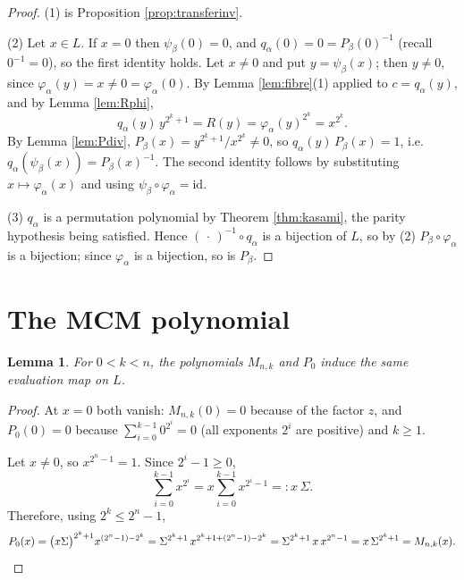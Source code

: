 \documentclass[11pt,a4paper]{article}
\newtheorem{lemma}[theorem]{Lemma}
\theoremstyle{definition}
\newcommand{\rhs}{R}
\begin{document}
\begin{proof}
(1) is Proposition \ref{prop:transferinv}.

(2) Let $x\in L$.  If $x=0$ then $\psi_\beta(0)=0$, and $q_\alpha(0)=0=P_\beta(0)^{-1}$
(recall $0^{-1}=0$), so the first identity holds.  Let $x\neq0$ and put
$y=\psi_\beta(x)$; then $y\neq0$, since $\varphi_\alpha(y)=x\neq0=\varphi_\alpha(0)$.
By Lemma \ref{lem:fibre}(1) applied to $c=q_\alpha(y)$, and by Lemma
\ref{lem:Rphi},
\[
  q_\alpha(y)\,y^{2^{k}+1}=\rhs(y)=\varphi_\alpha(y)^{2^{k}}=x^{2^{k}} .
\]
By Lemma \ref{lem:Pdiv}, $P_\beta(x)=y^{2^{k}+1}/x^{2^{k}}\neq0$, so
$q_\alpha(y)\,P_\beta(x)=1$, i.e. $q_\alpha(\psi_\beta(x))=P_\beta(x)^{-1}$.  The
second identity follows by substituting $x\mapsto\varphi_\alpha(x)$ and using
$\psi_\beta\circ\varphi_\alpha=\mathrm{id}$.

(3) $q_\alpha$ is a permutation polynomial by Theorem \ref{thm:kasami}, the parity
hypothesis being satisfied.  Hence $(\,\cdot\,)^{-1}\circ q_\alpha$ is a bijection
of $L$, so by (2) $P_\beta\circ\varphi_\alpha$ is a bijection; since
$\varphi_\alpha$ is a bijection, so is $P_\beta$.
\end{proof}

\section{The MCM polynomial}\label{sec:mcm}

\begin{lemma}\label{lem:mcmid}
For $0<k<n$, the polynomials $M_{n,k}$ and $P_0$ induce the same evaluation map on
$L$.
\end{lemma}

\begin{proof}
At $x=0$ both vanish: $M_{n,k}(0)=0$ because of the factor $z$, and
$P_0(0)=0$ because $\sum_{i=0}^{k-1}0^{2^{i}}=0$ (all exponents $2^{i}$ are
positive) and $k\ge1$.

Let $x\neq0$, so $x^{2^{n}-1}=1$.  Since $2^{i}-1\ge0$,
\[
  \sum_{i=0}^{k-1}x^{2^{i}}=x\sum_{i=0}^{k-1}x^{2^{i}-1}=:x\,\Sigma .
\]
Therefore, using $2^{k}\le2^{n}-1$,
\[
  P_0(x)=\bigl(x\Sigma\bigr)^{2^{k}+1}x^{(2^{n}-1)-2^{k}}
        =\Sigma^{2^{k}+1}\,x^{2^{k}+1+(2^{n}-1)-2^{k}}
        =\Sigma^{2^{k}+1}\,x\,x^{2^{n}-1}
        =x\,\Sigma^{2^{k}+1}=M_{n,k}(x). \qedhere
\]
\end{proof}
\end{document}
